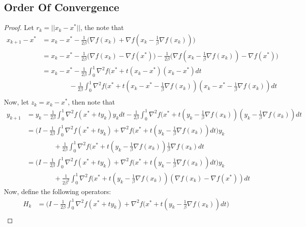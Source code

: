 \documentclass[12pt,twoside]{article}
\begin{document}
\subsection{Order Of Convergence}
\begin{proof}
Let $r_k = || x_k - x^* ||$, the note that
\begin{equation}
\begin{aligned}
x_{k+1} - x^* &= x_{k} - x^* - \frac{1}{2\beta} \big( \nabla f(x_k) + \nabla f(x_k - \frac{1}{\beta} \nabla f(x_k))	 \big)\\
 &= x_{k} - x^* - \frac{1}{2\beta} \big( \nabla f(x_k) - \nabla f(x^*) \big) - \frac{1}{2\beta} \big( \nabla f(x_k - \frac{1}{\beta} \nabla f(x_k)) - \nabla f(x^*) \big) \\
 &= x_{k} - x^* - \frac{1}{2\beta} \int_0^1 \nabla^2 f(x^* + t(x_k - x^*)(x_k - x^*)dt \\
& \quad \quad \quad \quad - \frac{1}{2\beta} \int_0^1 \nabla^2 f(x^* + t(x_k - x^* - \frac{1}{\beta} \nabla f(x_k) )(x_k - x^* - \frac{1}{\beta} \nabla f(x_k))dt \\
\end{aligned}
\end{equation}
Now, let $z_k = x_k - x^*$, then note that
\begin{equation}
\begin{aligned}
y_{k+1} &= y_k - \frac{1}{2\beta} \int_0^1 \nabla^2 f(x^* + ty_k)y_kdt - \frac{1}{2\beta} \int_0^1 \nabla^2 f(x^* + t(y_k - \frac{1}{\beta} \nabla f(x_k))(y_k - \frac{1}{\beta} \nabla f(x_k))dt \\
&= \big(I -  \frac{1}{2\beta} \int_0^1 \nabla^2 f(x^* + ty_k) + \nabla^2 f(x^* + t(y_k - \frac{1}{\beta} \nabla f(x_k)) dt  \big) y_k \\
& \quad \quad \quad \quad  + \frac{1}{2\beta} \int_0^1 \nabla^2 f(x^* + t(y_k - \frac{1}{\beta} \nabla f(x_k)) \frac{1}{\beta} \nabla f(x_k) dt \\
&= \big(I -  \frac{1}{2\beta} \int_0^1 \nabla^2 f(x^* + ty_k) + \nabla^2 f(x^* + t(y_k - \frac{1}{\beta} \nabla f(x_k)) dt  \big) y_k \\
& \quad \quad \quad \quad  + \frac{1}{2\beta^2} \int_0^1 \nabla^2 f(x^* + t(y_k - \frac{1}{\beta} \nabla f(x_k)) ( \nabla f(x_k)  - \nabla f(x^*) )dt
\end{aligned}
\end{equation}
Now, define the following operators:
\begin{equation}
\begin{aligned}
H_k &=  \big(I -  \frac{1}{2\beta} \int_0^1 \nabla^2 f(x^* + ty_k) + \nabla^2 f(x^* + t(y_k - \frac{1}{\beta} \nabla f(x_k)) dt  \big) \\

\end{aligned}
\end{equation}
\end{proof}
\end{document}
